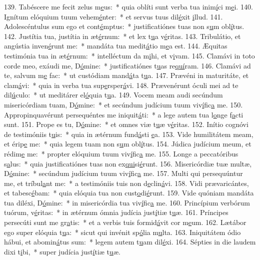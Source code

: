139. Tabéscere me fecit zelus m\uline{e}us:~* quia oblíti sunt verba tua inim\uline{í}ci m\uline{e}i.
140. Ignítum elóquium tuum vehem\uline{é}nter:~* et servus tuus dil\uline{é}xit \uline{i}llud.
141. Adolescéntulus sum ego et cont\uline{é}mptus:~* justificatiónes tuas non s\uline{u}m obl\uline{í}tus.
142. Justítia tua, justítia in æt\uline{é}rnum:~* et lex t\uline{u}a v\uline{é}ritas.
143. Tribulátio, et angústia inven\uline{é}runt me:~* mandáta tua medit\uline{á}tio m\uline{e}a est.
144. Æquitas testimónia tua in æt\uline{é}rnum:~* intelléctum da m\uline{i}hi, et v\uline{i}vam.
145. Clamávi in toto corde meo, exáudi me, D\uline{ó}mine:~* justificatiónes t\uline{u}as re\uline{quí}ram.
146. Clamávi ad te, salvum m\uline{e} fac:~* ut custódiam mand\uline{á}ta t\uline{u}a.
147. Prævéni in maturitáte, et clam\uline{á}vi:~* quia in verba tua sup\uline{e}rsper\uline{á}vi.
148. Prævenérunt óculi mei ad te dil\uline{ú}culo:~* ut meditárer el\uline{ó}quia t\uline{u}a.
149. Vocem meam audi secúndum misericórdiam tuam, D\uline{ó}mine:~* et secúndum judícium tuum viv\uline{í}fic\uline{a} me.
150. Appropinquavérunt persequéntes me iniquit\uline{á}ti:~* a lege autem tua l\uline{o}nge f\uline{a}cti sunt.
151. Prope es tu, D\uline{ó}mine:~* et omnes viæ t\uline{u}æ v\uline{é}ritas.
152. Inítio cognóvi de testimóniis t\uline{u}is:~* quia in ætérnum fund\uline{á}sti \uline{e}a.
153. Vide humilitátem meam, et érip\uline{e} me:~* quia legem tuam non s\uline{u}m obl\uline{í}tus.
154. Júdica judícium meum, et rédim\uline{e} me:~* propter elóquium tuum viv\uline{í}fic\uline{a} me.
155. Longe a peccatóribus s\uline{a}lus:~* quia justificatiónes tuas non ex\uline{qui}si\uline{é}runt.
156. Misericórdiæ tuæ multæ, D\uline{ó}mine:~* secúndum judícium tuum viv\uline{í}fic\uline{a} me.
157. Multi qui persequúntur me, et tríbul\uline{a}nt me:~* a testimóniis tuis non d\uline{e}clin\uline{á}vi.
158. Vidi prævaricántes, et tabesc\uline{é}bam:~* quia elóquia tua non cust\uline{o}di\uline{é}runt.
159. Vide quóniam mandáta tua diléxi, D\uline{ó}mine:~* in misericórdia tua viv\uline{í}fic\uline{a} me.
160. Princípium verbórum tuórum, v\uline{é}ritas:~* in ætérnum ómnia judícia just\uline{í}tiæ t\uline{u}æ.
161. Príncipes persecúti sunt me gr\uline{a}tis:~* et a verbis tuis formid\uline{á}vit cor m\uline{e}um.
162. Lætábor ego super elóquia t\uline{u}a:~* sicut qui invénit sp\uline{ó}lia m\uline{u}lta.
163. Iniquitátem ódio hábui, et abomin\uline{á}tus sum:~* legem autem t\uline{u}am dil\uline{é}xi.
164. Sépties in die laudem dixi t\uline{i}bi,~* super judícia just\uline{í}tiæ t\uline{u}æ.
